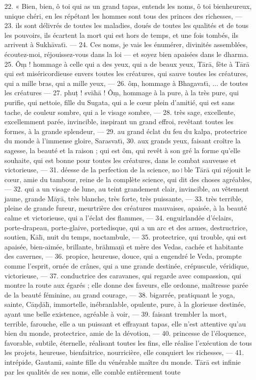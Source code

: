 \documentclass[a4paper, 11pt, oneside, french, landscape, twocolumn]{article}
\begin{document}
22. « Bien, bien, ô toi qui as un grand tapas, entends les noms, ô toi bienheureux, unique chéri, en les répétant les hommes sont tous des princes des richesses, --- 23. ils sont délivrés de toutes les maladies, doués de toutes les qualités et de tous les pouvoirs, ils écartent la mort qui est hors de temps, et une fois tombés, ils arrivent à Sukh\={a}vat\={\i}. --- 24. Ces noms, je vais les énumérer, divinités assemblées, écoutez-moi, réjouissez-vous dans la loi --- et soyez bien apaisées dans le dharma. 25. Ô\d{m} ! hommage à celle qui a des yeux, qui a de beaux yeux, T\={a}r\={a}, fête à T\={a}r\={a} qui est miséricordieuse envers toutes les créatures, qui sauve toutes les créatures, qui a mille bras, qui a mille yeux, --- 26. ô\d{m}, hommage à Bhagavat\={\i}, ... de toutes les créatures --- 27. phu\d{t} ! sv\={a}h\={a} ! Ô\d{m}, hommage à la pure, à la très pure, qui purifie, qui nettoie, fille du Sugata, qui a le cœur plein d'amitié, qui est sans tache, de couleur sombre, qui a le visage sombre, --- 28. très sage, excellente, excellemment parée, invincible, inspirant un grand effroi, revêtant toutes les formes, à la grande splendeur, --- 29. au grand éclat du feu du kalpa, protectrice du monde à l'immense gloire, Sarasvat\={\i}, 30. aux grands yeux, faisant croître la sagesse, la beauté et la raison ; qui est ôm, qui revêt à son gré la forme qu'elle souhaite, qui est bonne pour toutes les créatures, dans le combat sauveuse et victorieuse, --- 31. déesse de la perfection de la science, no।ble T\={a}r\={a} qui réjouit le cœur, amie du tambour, reine de la complète science, qui dit des choses agréables,--- 32. qui a un visage de lune, au teint grandement clair, invincible, au vêtement jaune, grande M\={a}y\={a}, très blanche, très forte, très puissante, --- 33. très terrible, pleine de grande fureur, meurtrière des créatures mauvaises, apaisée, à la beauté calme et victorieuse, qui a l'éclat des flammes, --- 34. enguirlandée d'éclairs, porte-drapeau, porte-glaive, portedisque, qui a un arc et des armes, destructrice, soutien, K\={a}l\={\i}, nuit du temps, noctambule, --- 35. protectrice, qui trouble, qui est apaisée, bien-aimée, brillante, br\={a}hma\d{n}\={\i} et mère des Vedas, cachée et habitante des cavernes, --- 36. propice, heureuse, douce, qui a engendré le Veda, prompte comme l'esprit, ornée de crânes, qui a une grande destinée, crépuscule, véridique, victorieuse, --- 37. conductrice des caravanes, qui regarde avec compassion, qui montre la route aux égarés ; elle donne des faveurs, elle ordonne, maîtresse parée de la beauté féminine, au grand courage, --- 38. bigarrée, pratiquant le yoga, sainte, C\={a}\d{n}\d{d}\={a}l\={\i}, immortelle, inébranlable, opulente, pure, à la glorieuse destinée, ayant une belle existence, agréable à voir, --- 39. faisant trembler la mort, terrible, farouche, elle a un puissant et effrayant tapas, elle n'est attentive qu'au bien du monde, protectrice, amie de la dévotion, --- 40. princesse de l'éloquence, favorable, subtile, éternelle, réalisant toutes les fins, elle réalise l'exécution de tous les projets, heureuse, bienfaitrice, nourricière, elle conquiert les richesses, --- 41. intrépide, Gautam\={\i}, sainte fille du vénérable maître du monde. T\={a}r\={a} est infinie par les qualités de ses noms, elle comble entièrement toute 
\end{document}
